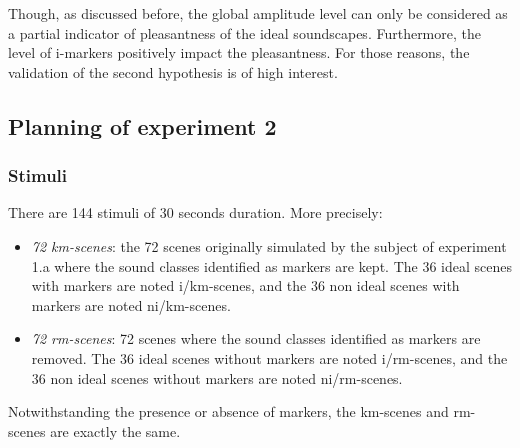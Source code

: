 \documentclass[twoside,twocolumn]{article}
\begin{document}
Though, as discussed before, the global amplitude level can only be considered as a partial indicator of pleasantness of the ideal soundscapes. Furthermore, the level of i-markers positively impact the pleasantness. For those reasons, the validation of the second hypothesis is of high interest.

\subsection{Planning of experiment 2}

\subsubsection*{Stimuli}


There are 144 stimuli of 30 seconds duration. More precisely:

\begin{itemize}
\item \emph{72 km-scenes}: the 72 scenes originally simulated by the subject of experiment 1.a where the sound classes identified as markers are kept. The 36 ideal scenes with markers are noted i/km-scenes, and the 36 non ideal scenes with markers are noted ni/km-scenes.
\item \emph{72 rm-scenes}:  72 scenes where the sound classes identified as markers are removed. The 36 ideal scenes without markers are noted i/rm-scenes, and the 36 non ideal scenes without markers are noted ni/rm-scenes.
\end{itemize}



Notwithstanding the presence or absence of markers, the km-scenes and rm-scenes are exactly the same.
\end{document}
